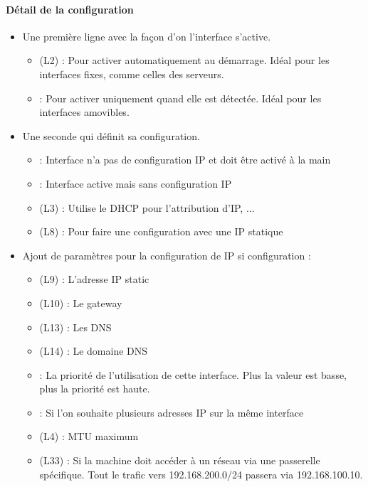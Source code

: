 \documentclass{article}
\begin{document}
\paragraph{Détail de la configuration}
\begin{itemize}
    \item Une première ligne avec la façon d’on l’interface s’active.
    \begin{itemize}
        \item (L2)   : Pour activer automatiquement au démarrage. Idéal pour les interfaces fixes, comme celles des serveurs.
        \item {} : Pour activer uniquement quand elle est détectée. Idéal pour les interfaces amovibles.
    \end{itemize}
    \item Une seconde qui définit sa configuration.
    \begin{itemize}
        \item {} : Interface n'a pas de configuration IP et doit être activé à la main
        \item {} : Interface active mais sans configuration IP
        \item (L3)  : Utilise le DHCP pour l'attribution d'IP, ...
        \item (L8)  : Pour faire une configuration avec une IP statique
    \end{itemize}
    \item Ajout de paramètres pour la configuration de IP si configuration  :
    \begin{itemize}
        \item (L9)  : L'adresse IP static
        \item (L10)  : Le gateway
        \item (L13)  : Les DNS
        \item (L14)  : Le domaine DNS
        \item {} : La priorité de l'utilisation de cette interface. Plus la valeur est basse, plus la priorité est haute.
        \item {} : Si l'on souhaite plusieurs adresses IP sur la même interface
        \item (L4)  : MTU maximum
        \item (L33)  : Si la machine doit accéder à un réseau via une passerelle spécifique. Tout le trafic vers 192.168.200.0/24 passera via 192.168.100.10.
    \end{itemize}
\end{itemize}
\end{document}

